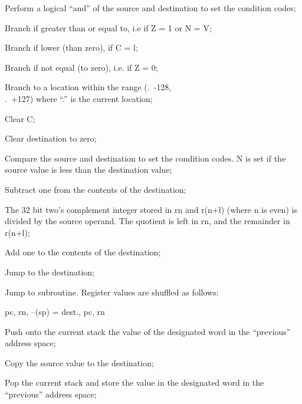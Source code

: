 \item[bit] Perform a logical ``and'' of the
source and destination to set the
condition codes;

\item[ble] Branch if greater than or
equal to, i.e if Z = 1 or N = V;


\item[blo] Branch if lower (than zero),
if C = l;


\item[bne] Branch if not equal (to zero),
i.e. if Z = 0;


\item[br] Branch to a location within the
range (.~-128,\\
.~+127) where ``.'' is the current location;

\item[clc] Clear C;

\item[clr] Clear destination to zero;


\item[cmp] Compare the source and destination
to set the condition codes. N is
set if the source value is less
than the destination value;


\item[dec] Subtract one from the contents of
the destination;


\item[div] The 32 bit two's complement
integer stored in rn and r(n+l)
(where n is even) is divided by
the source operand. The quotient
is left in rn, and the remainder
in r(n+l);


\item[inc] Add one to the contents of the
destination;


\item[jmp] Jump to the destination;

\item[jsr] Jump to subroutine. Register
values are shuffled as follows:

pc, rn, --(sp) = dest., pc, rn


\item[mfpi] Push onto the current stack the
value of the designated word in
the ``previous'' address space;


\item[mov] Copy the source value to the destination;


\item[mtpi] Pop the current stack and store
the value in the designated word
in the ``previous'' address space;


